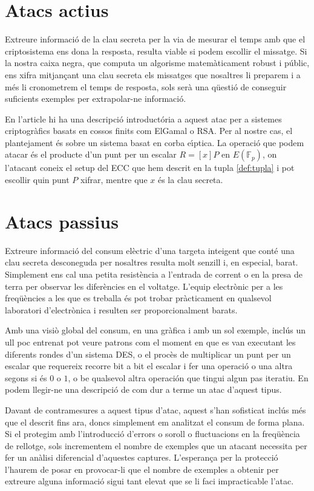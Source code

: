 \documentclass[12pt,twoside,catalan,a4paper]{book}%
\numberwithin{figure}{section}		%
\theoremstyle{definition}   			%
\def\ce{corba e\lgem{}\'{\i}ptica}%
\def\cfs{cossos finits}%
\newcommand{\EFp}{\ensuremath{E(\mathbb{F}_p)}}%
\theoremstyle{saltolinea}   			%
\begin{document}
\section{Atacs actius}

Extreure informaci\'o de la clau secreta per la via de mesurar el temps amb que el criptosistema ens dona la resposta, resulta viable si podem escollir el missatge. Si la nostra caixa negra, que computa un algorisme matem\`aticament robust i p\'ublic, ens xifra mitjan\c cant una clau secreta els missatges que nosaltres li preparem i a m\'es li cronometrem el temps de resposta, sols ser\`a una q\"uesti\'o de conseguir suficients exemples per extrapolar-ne informaci\'o.

En l'article \cite{HAGAI} hi ha una descripci\'o introduct\'oria a aquest atac per a sistemes criptogr\`afics basats en \cfs{} com ElGamal o RSA. Per al nostre cas, el plantejament \'es sobre un sistema basat en \ce. La operaci\'o que podem atacar \'es el producte d'un punt per un escalar $R=\left[x\right] P$ en \EFp, on l'atacant coneix el setup del ECC que hem descrit en la tupla \ref{def:tupla} i pot escollir quin punt $P$ xifrar, mentre que $x$ \'es la clau secreta.

\section{Atacs passius}

Extreure informaci\'o del consum el\`ectric d'una targeta inte\lgem{}igent que cont\'e una clau secreta desconeguda per nosaltres resulta molt senzill i, en especial, barat. Simplement ens cal una petita resist\`encia a l'entrada de corrent o en la presa de terra per observar les difer\`encies en el voltatge. L'equip electr\`onic per a les freq\"u\`encies a les que es treballa \'es pot trobar pr\`acticament en qualsevol laboratori d'electr\`onica i resulten ser proporcionalment barats.

Amb una visi\`o global del consum, en una gr\`afica i amb un sol exemple, incl\'us un ull poc entrenat pot veure patrons com el moment en que es van executant les diferents rondes d'un sistema DES, o el proc\`es de multiplicar un punt per un escalar que requereix recorre bit a bit el escalar i fer una operaci\'o o una altra segons si \'es $0$ o $1$, o be qualsevol altra operaci\'on que tingui algun pas iteratiu. En \cite{KJJ} podem llegir-ne una descripci\'o de com dur a terme un atac d'aquest tipus.

Davant de contramesures a aquest tipus d'atac, aquest s'han sofisticat incl\'us m\'es que el descrit fins ara, doncs simplement em analitzat el consum de forma plana. Si el protegim amb l'introducci\'o d'errors o soroll o fluctuacions en la freq\"u\`encia de rellotge, sols incrementem el nombre de exemples que un atacant necessita per fer un an\`alisi diferencial d'aquestes captures. L'esperan\c{c}a per la protecci\'o l'haurem de posar en provocar-li que el nombre de exemples a obtenir per extreure alguna informaci\'o sigui tant elevat que se li faci impracticable l'atac.
\end{document}
